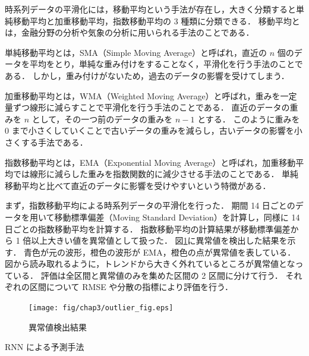 \documentclass[twocolumn,fleqn,10pt]{jarticle}
\makeatletter
\renewcommand{\subsection}{\@startsection
{subsection}{3}{0mm}{5mm}{0.01pt}{\bfseries \normalsize}}
\makeatother
\begin{document}
時系列データの平滑化には，移動平均という手法が存在し，大きく分類すると単純移動平均と加重移動平均，指数移動平均の 3 種類に分類できる．
移動平均とは，金融分野の分析や気象の分析に用いられる手法のことである．


単純移動平均とは，SMA（Simple Moving Average）と呼ばれ，直近の $n$ 個のデータを平均をとり，単純な重み付けをすることなく，平滑化を行う手法のことである．
しかし，重み付けがないため，過去のデータの影響を受けてしまう．


加重移動平均とは，WMA（Weighted Moving Average）と呼ばれ，重みを一定量ずつ線形に減らすことで平滑化を行う手法のことである．
直近のデータの重みを $n$ として，その一つ前のデータの重みを $n-1$ とする．
このように重みを 0 まで小さくしていくことで古いデータの重みを減らし，古いデータの影響を小さくする手法である．


指数移動平均とは，EMA（Exponential Moving Average）と呼ばれ，加重移動平均では線形に減らした重みを指数関数的に減少させる手法のことである．
単純移動平均と比べて直近のデータに影響を受けやすいという特徴がある．


まず，指数移動平均による時系列データの平滑化を行った．
期間 14 日ごとのデータを用いて移動標準偏差（Moving Standard Deviation）を計算し，同様に 14 日ごとの指数移動平均を計算する．
指数移動平均の計算結果が移動標準偏差から 1 倍以上大きい値を異常値として扱った．
図\ref{fig:outlier}に異常値を検出した結果を示す．
青色が元の波形，橙色の波形が EMA，橙色の点が異常値を表している．
図から読み取れるように，トレンドから大きく外れているところが異常値となっている．
評価は全区間と異常値のみを集めた区間の 2 区間に分けて行う．
それぞれの区間について RMSE や分散の指標により評価を行う．





\begin{figure}[b]
  \texttt{[image: fig/chap3/outlier\_fig.eps]}
  \vspace{-8mm}
  \caption{異常値検出結果}
  \label{fig:outlier}
\end{figure}












\subsection{RNN による予測手法}
\end{document}
